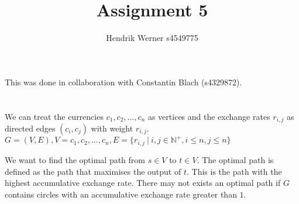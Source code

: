 \documentclass[12pt]{article}
\title {Assignment 5}
\author {Hendrik Werner s4549775}
\begin{document}
\maketitle

This was done in collaboration with Constantin Blach (s4329872).

\section{} %
\section{} %
\section{} %
\section{} %
We can treat the currencies $c_1, c_2, \dots, c_n$ as vertices and the exchange rates $r_{i, j}$ as directed edges $(c_i, c_j)$ with weight $r_{i, j}$. $G = (V, E), V = c_1, c_2, \dots, c_n, E = \{r_{i, j}\ |\ i, j \in \mathbb{N^+}, i \leq n, j \leq n\}$

We want to find the optimal path from $s \in V$ to $t \in V$. The optimal path is defined as the path that maximises the output of $t$. This is the path with the highest accumulative exchange rate. There may not exists an optimal path if $G$ contains circles with an accumulative exchange rate greater than $1$.

\section{} %
\end{document}
